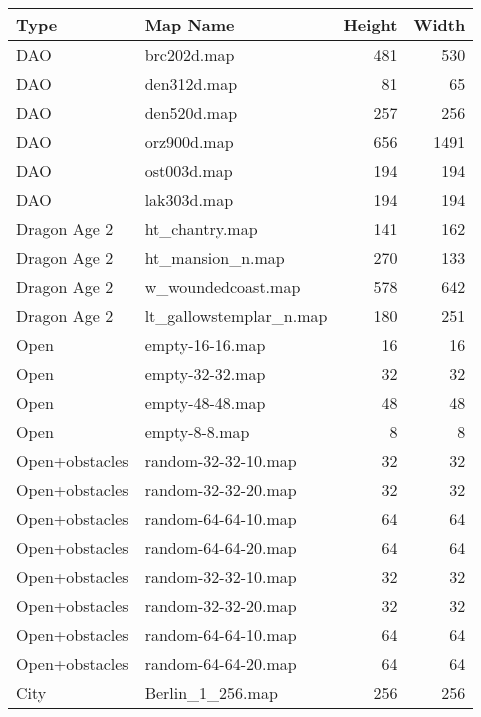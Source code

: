 \begin{table}[]
\small
\begin{tabular}{@{}llrr@{}}
\toprule
Type & Map Name                  & Height & Width \\ \midrule
DAO     & brc202d.map               & 481    & 530   \\
DAO     & den312d.map               & 81     & 65    \\
DAO     & den520d.map               & 257    & 256   \\
DAO     & orz900d.map               & 656    & 1491  \\
DAO     & ost003d.map               & 194    & 194   \\
DAO     & lak303d.map               & 194    & 194   \\
Dragon Age 2     & ht\_chantry.map           & 141    & 162   \\
Dragon Age 2     & ht\_mansion\_n.map        & 270    & 133   \\
Dragon Age 2     & w\_woundedcoast.map       & 578    & 642   \\ 
Dragon Age 2     & lt\_gallowstemplar\_n.map & 180    & 251   \\
Open     & empty-16-16.map           & 16     & 16    \\
Open     & empty-32-32.map           & 32     & 32    \\
Open     & empty-48-48.map           & 48     & 48    \\
Open     & empty-8-8.map             & 8      & 8     \\
Open+obstacles     & random-32-32-10.map       & 32     & 32    \\
Open+obstacles     & random-32-32-20.map       & 32     & 32    \\
Open+obstacles     & random-64-64-10.map       & 64     & 64    \\
Open+obstacles     & random-64-64-20.map       & 64     & 64    \\
Open+obstacles     & random-32-32-10.map       & 32     & 32    \\
Open+obstacles     & random-32-32-20.map       & 32     & 32    \\
Open+obstacles     & random-64-64-10.map       & 64     & 64    \\
Open+obstacles     & random-64-64-20.map       & 64     & 64    \\
City     & Berlin\_1\_256.map        & 256    & 256   \\

\end{tabular}
\end{table}
